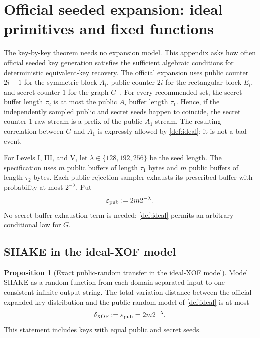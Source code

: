 \documentclass[11pt,a4paper]{article}
\theoremstyle{definition}
\newtheorem{proposition}[theorem]{Proposition}
\theoremstyle{remark}
\begin{document}
\section{Official seeded expansion: ideal primitives and fixed functions}\label{app:seeded-transfer}

The key-by-key theorem needs no expansion model.  This appendix asks how often official seeded key generation satisfies the sufficient algebraic conditions for deterministic equivalent-key recovery.  The official expansion uses public counter $2i-1$ for the symmetric block $A_i$, public counter $2i$ for the rectangular block $E_i$, and secret counter $1$ for the graph $G$~\cite[Secs.~4.7--4.10]{QRUOVSpec}.  For every recommended set, the secret buffer length $\tau_2$ is at most the public $A_i$ buffer length $\tau_1$.  Hence, if the independently sampled public and secret seeds happen to coincide, the secret counter-$1$ raw stream is a prefix of the public $A_1$ stream.  The resulting correlation between $G$ and $A_1$ is expressly allowed by \cref{def:ideal}; it is not a bad event.

For Levels I, III, and V, let $\lambda\in\{128,192,256\}$ be the seed length.  The specification uses $m$ public buffers of length $\tau_1$ bytes and $m$ public buffers of length $\tau_2$ bytes.  Each public rejection sampler exhausts its prescribed buffer with probability at most $2^{-\lambda}$.  Put
\begin{equation}\label{eq:public-rejection}
\varepsilon_{\rm pub}:=2m2^{-\lambda}.
\end{equation}
No secret-buffer exhaustion term is needed: \cref{def:ideal} permits an arbitrary conditional law for $G$.

\subsection{SHAKE in the ideal-XOF model}

\begin{proposition}[Exact public-random transfer in the ideal-XOF model]\label{prop:rom-transfer}
Model SHAKE as a random function from each domain-separated input to one consistent infinite output string.  The total-variation distance between the official expanded-key distribution and the public-random model of \cref{def:ideal} is at most
\[
\delta_{\rm XOF}:=\varepsilon_{\rm pub}=2m2^{-\lambda}.
\]
This statement includes keys with equal public and secret seeds.
\end{proposition}
\end{document}
